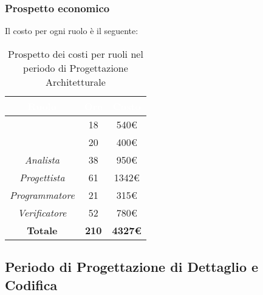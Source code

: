 \subsubsection{Prospetto economico}
Il costo per ogni ruolo è il seguente:
\begin{table}[H]
	\begin{center}
		\begin{tabular}{ |c c c| }
		\rowcolor{darkblue} 
		\textcolor{white}{\textbf{Ruolo}} & \textcolor{white}{\textbf{Ore}} & \textcolor{white}{\textbf{Costo}} \\ \hline
		\textit{\Responsabile} 	& 18 & 540€ \\ \hline
		\textit{\Amministratore} 	& 20 & 400€ \\ \hline
		\textit{Analista} 		& 38 & 950€ \\ \hline
		\textit{Progettista} 	& 61 & 1342€\\ \hline
		\textit{Programmatore}  	& 21 & 315€ \\ \hline
		\textit{Verificatore} 	& 52 & 780€ \\ \hline
		\textbf{Totale} & \textbf{210} & \textbf{4327€} \\ \hline
		\end{tabular}
	\caption{ Prospetto dei costi per ruoli nel periodo di Progettazione Architetturale}
	\end{center}
\end{table}

\subsection{Periodo di Progettazione di Dettaglio e Codifica}
